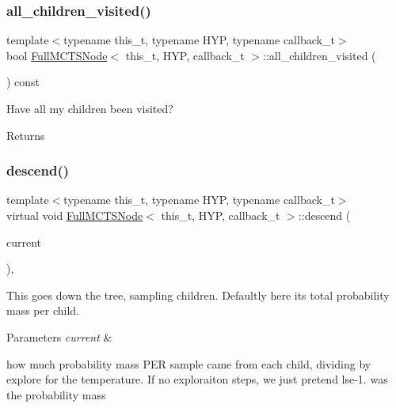 \subsubsection{\texorpdfstring{all\+\_\+children\+\_\+visited()}{all\_children\_visited()}}
{\footnotesize\ttfamily template$<$typename this\+\_\+t, typename H\+YP, typename callback\+\_\+t$>$ \\
bool \hyperlink{class_full_m_c_t_s_node}{Full\+M\+C\+T\+S\+Node}$<$ this\+\_\+t, H\+YP, callback\+\_\+t $>$\+::all\+\_\+children\+\_\+visited (\begin{DoxyParamCaption}{ }\end{DoxyParamCaption}) const\hspace{0.3cm}{\ttfamily [inline]}}



Have all my children been visited? 

\begin{DoxyReturn}{Returns}

\end{DoxyReturn}
\mbox{\label{class_full_m_c_t_s_node_ab5cf544f500703c9b8b46892a961ec32}} 
\subsubsection{\texorpdfstring{descend()}{descend()}}
{\footnotesize\ttfamily template$<$typename this\+\_\+t, typename H\+YP, typename callback\+\_\+t$>$ \\
virtual void \hyperlink{class_full_m_c_t_s_node}{Full\+M\+C\+T\+S\+Node}$<$ this\+\_\+t, H\+YP, callback\+\_\+t $>$\+::descend (\begin{DoxyParamCaption}\item[{H\+YP \&}]{current }\end{DoxyParamCaption})\hspace{0.3cm}{\ttfamily [inline]}, {\ttfamily [virtual]}}



This goes down the tree, sampling children. Defaultly here it\textquotesingle{}s total probability mass per child. 


\begin{DoxyParams}{Parameters}
{\em current} & \\
\hline
\end{DoxyParams}
how much probability mass P\+ER sample came from each child, dividing by explore for the temperature. If no exploraiton steps, we just pretend lse-\/1. was the probability mass \mbox{\label{class_full_m_c_t_s_node_aac59f75931712d329f0b2142d786d03a}} 
